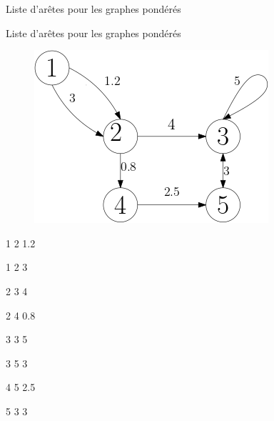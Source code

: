 \documentclass[10pt,xcolor=dvipsnames]{beamer}
\begin{document}
\begin{frame}{Liste d'arêtes pour les graphes pondérés}
\begin{exampleblock}{Liste d'arêtes pour les graphes pondérés}
        \begin{minipage}{0.6\textwidth}
    \begin{figure}
        \centering
        \includegraphics[scale=0.3]{figures/CM3/weighted-graph.png}
        \label{fig:my_label}
    \end{figure}
    \end{minipage}
    \begin{minipage}{0.35\textwidth}
    \begin{description}
        \item 1 2 1.2
        \item 1 2 3
        \item 2 3 4
        \item 2 4 0.8
        \item 3 3 5
        \item 3 5 3
        \item 4 5 2.5
        \item 5 3 3
    \end{description}
    \end{minipage}
    \end{exampleblock}
\end{frame}
\end{document}
